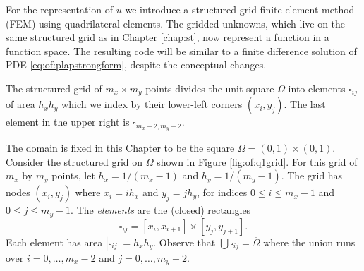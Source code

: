 For the representation of $u$ we introduce a structured-grid finite element method (FEM) using quadrilateral elements.  The gridded unknowns, which live on the same structured grid as in Chapter \ref{chap:st}, now represent a function in a function space.  The resulting code will be similar to a finite difference solution of PDE \eqref{eq:of:plapstrongform}, despite the conceptual changes.

\begin{marginfigure}
\medskip

\caption{The structured grid of $m_x\times m_y$ points divides the unit square $\Omega$ into elements $\square_{ij}$ of area $h_x h_y$ which we index by their lower-left corners $(x_i,y_j)$.  The last element in the upper right is $\square_{m_x-2,m_y-2}$.}
\label{fig:of:q1grid}
\end{marginfigure}

The domain is fixed in this Chapter to be the square $\Omega = (0,1)\times (0,1)$.  Consider the structured grid on $\Omega$ shown in Figure \ref{fig:of:q1grid}.  For this grid of $m_x$ by $m_y$ points, let $h_x=1/(m_x-1)$ and $h_y=1/(m_y-1)$.  The grid has nodes $(x_i,y_j)$ where $x_i = i h_x$ and $y_j = j h_y$, for indices $0\le i \le m_x-1$ and $0 \le j \le m_y-1$.  The \emph{elements} are the (closed) rectangles
   $$\square_{ij} = [x_i,x_{i+1}] \times [y_j,y_{j+1}].$$
Each element has area $|\square_{ij}| = h_x h_y$.  Observe that $\bigcup  \square_{ij} = \overline \Omega$ where the union runs over $i=0,\dots,m_x-2$ and $j=0,\dots,m_y-2$.


